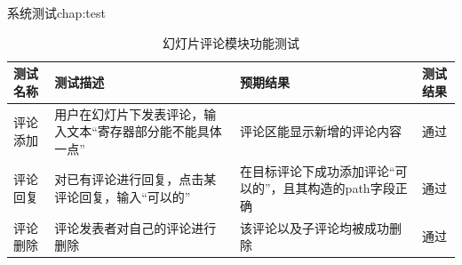 \begin{cuzchapter}{系统测试}{chap:test}
    \begin{table}[htbp]
        \caption{幻灯片评论模块功能测试}
        \label{tab:test-comment}
        \centering
        \begin{tabular}{>{\raggedright\arraybackslash}p{2.5cm} >{\raggedright\arraybackslash}p{5.5cm} >{\raggedright\arraybackslash}p{4cm} c}
            \toprule
            测试名称 & 测试描述       & 预期结果          & 测试结果 \\
            \midrule
            评论添加 & 用户在幻灯片下发表评论，输入文本“寄存器部分能不能具体一点” & 评论区能显示新增的评论内容 & 通过 \\
            \addlinespace
            评论回复 & 对已有评论进行回复，点击某评论回复，输入“可以的”    & 在目标评论下成功添加评论“可以的”，且其构造的path字段正确 & 通过 \\
            \addlinespace
            评论删除 & 评论发表者对自己的评论进行删除   &  该评论以及子评论均被成功删除 & 通过 \\
            \bottomrule
        \end{tabular}
    \end{table}






\end{cuzchapter}
